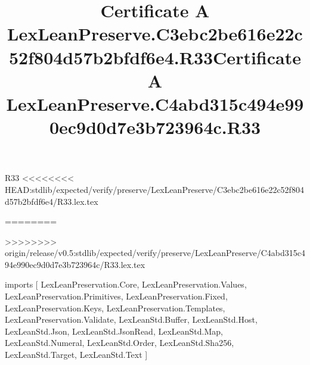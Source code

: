 \begin{lexlean}{R33}
<<<<<<<< HEAD:stdlib/expected/verify/preserve/LexLeanPreserve/C3ebc2be616e22c52f804d57b2bfdf6e4/R33.lex.tex
\title{Certificate A LexLeanPreserve.C3ebc2be616e22c52f804d57b2bfdf6e4.R33}
========
\title{Certificate A LexLeanPreserve.C4abd315c494e990ec9d0d7e3b723964c.R33}
>>>>>>>> origin/release/v0.5:stdlib/expected/verify/preserve/LexLeanPreserve/C4abd315c494e990ec9d0d7e3b723964c/R33.lex.tex
\begin{coremodule}
imports [
  LexLeanPreservation.Core,
  LexLeanPreservation.Values,
  LexLeanPreservation.Primitives,
  LexLeanPreservation.Fixed,
  LexLeanPreservation.Keys,
  LexLeanPreservation.Templates,
  LexLeanPreservation.Validate,
  LexLeanStd.Buffer,
  LexLeanStd.Host,
  LexLeanStd.Json,
  LexLeanStd.JsonRead,
  LexLeanStd.Map,
  LexLeanStd.Numeral,
  LexLeanStd.Order,
  LexLeanStd.Sha256,
  LexLeanStd.Target,
  LexLeanStd.Text
]


\end{coremodule}
\end{lexlean}
